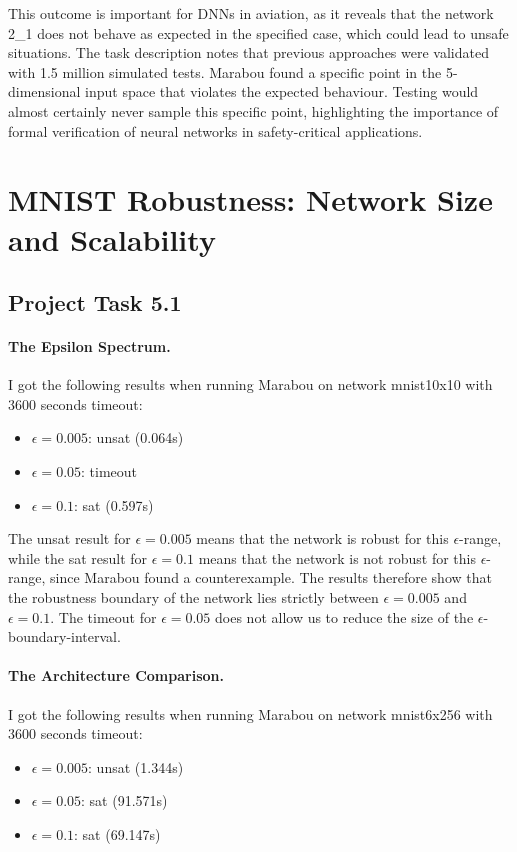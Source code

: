 \documentclass[12pt,a4paper]{article}
\begin{document}
This outcome is important for DNNs in aviation, as it reveals that the network 2\_1 does not behave as expected in the 
specified case, which could lead to unsafe situations. The task description notes that previous approaches were validated 
with 1.5 million simulated tests. Marabou found a specific point in the 5-dimensional input space that violates the 
expected behaviour. Testing would almost certainly never sample this specific point, highlighting the importance of formal 
verification of neural networks in safety-critical applications.


\section*{MNIST Robustness: Network Size and Scalability}
\subsection*{Project Task 5.1}
\paragraph{The Epsilon Spectrum.} I got the following results when running Marabou on network mnist10x10 with 3600 seconds 
timeout:
\begin{itemize}
    \item $\epsilon = 0.005$: unsat (0.064s)
    \item $\epsilon = 0.05$: timeout
    \item $\epsilon = 0.1$: sat (0.597s)
\end{itemize}

The unsat result for $\epsilon = 0.005$ means that the network is robust for this $\epsilon$-range, while the sat result for 
$\epsilon = 0.1$ means that the network is not robust for this $\epsilon$-range, since Marabou found a counterexample. The 
results therefore show that the robustness boundary of the network lies strictly between $\epsilon = 0.005$ and $\epsilon = 0.1$. 
The timeout for $\epsilon = 0.05$ does not allow us to reduce the size of the $\epsilon$-boundary-interval.

\paragraph{The Architecture Comparison.} I got the following results when running Marabou on network mnist6x256 with 3600 seconds 
timeout:
\begin{itemize}
    \item $\epsilon = 0.005$: unsat (1.344s)
    \item $\epsilon = 0.05$: sat (91.571s)
    \item $\epsilon = 0.1$: sat (69.147s)
\end{itemize}
\end{document}
